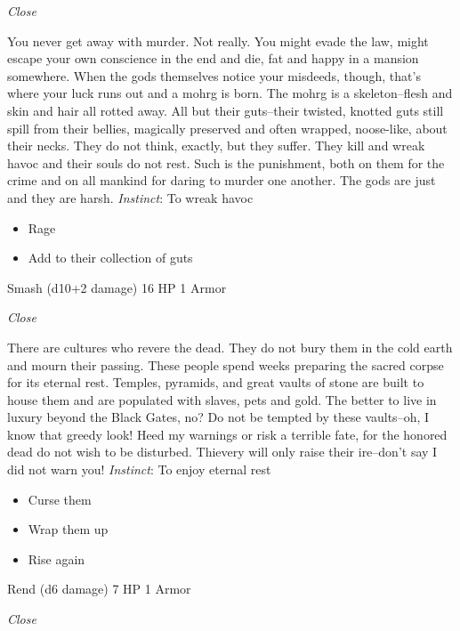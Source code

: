 \emph{Close}

\HRule
You never get away with murder. Not really. You might evade the law, might escape your own conscience in the end and die, fat and happy in a mansion somewhere. When the gods themselves notice your misdeeds, though, that's where your luck runs out and a mohrg is born. The mohrg is a skeleton--flesh and skin and hair all rotted away. All but their guts--their twisted, knotted guts still spill from their bellies, magically preserved and often wrapped, noose-like, about their necks. They do not think, exactly, but they suffer. They kill and wreak havoc and their souls do not rest. Such is the punishment, both on them for the crime and on all mankind for daring to murder one another. The gods are just and they are harsh. \emph{Instinct}: To wreak havoc
\begin{itemize}
\item Rage
\item Add to their collection of guts
\end{itemize}

\HRule
{}

Smash (d10+2 damage)\hspace*{\fill} 16 HP 1 Armor

\emph{Close}

\HRule
There are cultures who revere the dead. They do not bury them in the cold earth and mourn their passing. These people spend weeks preparing the sacred corpse for its eternal rest. Temples, pyramids, and great vaults of stone are built to house them and are populated with slaves, pets and gold. The better to live in luxury beyond the Black Gates, no? Do not be tempted by these vaults--oh, I know that greedy look! Heed my warnings or risk a terrible fate, for the honored dead do not wish to be disturbed. Thievery will only raise their ire--don't say I did not warn you! \emph{Instinct}: To enjoy eternal rest
\begin{itemize}
\item Curse them
\item Wrap them up
\item Rise again
\end{itemize}

\HRule
{}

Rend (d6 damage)\hspace*{\fill} 7 HP 1 Armor

\emph{Close}

